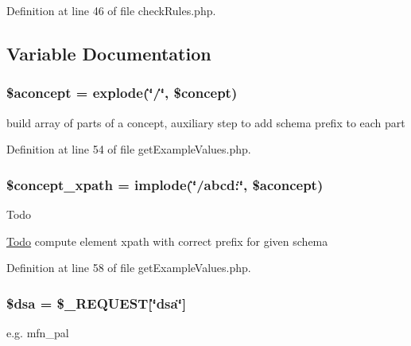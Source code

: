 Definition at line 46 of file check\+Rules.\+php.



\subsection{Variable Documentation}
\subsubsection[{\texorpdfstring{\$aconcept}{$aconcept}}]{\setlength{\rightskip}{0pt plus 5cm}\$aconcept = explode(\char`\"{}/\char`\"{}, \$concept)}\hypertarget{namespace_consistency_a7ab539c1f2610226e15527ae9f66d1b4}{}\label{namespace_consistency_a7ab539c1f2610226e15527ae9f66d1b4}
build array of parts of a concept, auxiliary step to add schema prefix to each part 

Definition at line 54 of file get\+Example\+Values.\+php.

\subsubsection[{\texorpdfstring{\$concept\+\_\+xpath}{$concept_xpath}}]{\setlength{\rightskip}{0pt plus 5cm}\$concept\+\_\+xpath = implode(\char`\"{}/abcd\+:\char`\"{}, \$aconcept)}\hypertarget{namespace_consistency_a6de4812dd264c558f2dadf3ae20b1da2}{}\label{namespace_consistency_a6de4812dd264c558f2dadf3ae20b1da2}
\begin{DoxyRefDesc}{Todo}
\item[\hyperlink{todo__todo000005}{Todo}]compute element xpath with correct prefix for given schema \end{DoxyRefDesc}


Definition at line 58 of file get\+Example\+Values.\+php.

\subsubsection[{\texorpdfstring{\$dsa}{$dsa}}]{\setlength{\rightskip}{0pt plus 5cm}\$dsa = \$\+\_\+\+R\+E\+Q\+U\+E\+ST\mbox{[}\char`\"{}dsa\char`\"{}\mbox{]}}\hypertarget{namespace_consistency_aca6ad28ee812df74bbd827a9d244055e}{}\label{namespace_consistency_aca6ad28ee812df74bbd827a9d244055e}
e.\+g. mfn\+\_\+pal 

